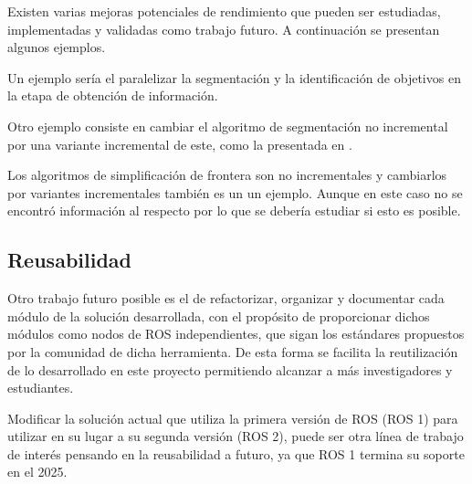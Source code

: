 
Existen varias mejoras potenciales de rendimiento que pueden ser estudiadas,
implementadas y validadas como trabajo futuro. A continuación se presentan
algunos ejemplos.

Un ejemplo sería el paralelizar la segmentación y la identificación de
objetivos en la etapa de obtención de información.

Otro ejemplo consiste en cambiar el algoritmo de segmentación no incremental por una variante
incremental de este, como la presentada en \cite{Liu2015}. 

Los algoritmos de simplificación de frontera son no incrementales y cambiarlos
por variantes incrementales también es un un ejemplo. Aunque en este caso no se
encontró información al respecto por lo que se debería estudiar si esto es
posible.



\subsection{Reusabilidad}

Otro trabajo futuro posible es el de refactorizar, organizar y documentar cada
módulo de la solución desarrollada, con el propósito de proporcionar dichos
módulos como nodos de \gls{ROS} independientes, que sigan los estándares propuestos
por la comunidad de dicha herramienta. De esta forma se facilita la
reutilización de lo desarrollado en este proyecto permitiendo
alcanzar a más investigadores y estudiantes.

Modificar la solución actual que utiliza la primera versión de \gls{ROS} (\gls{ROS} 1)
para utilizar en su lugar a su segunda versión (\gls{ROS} 2), puede ser otra línea de
trabajo de interés pensando en la reusabilidad a futuro, ya que \gls{ROS} 1 termina
su soporte en el 2025.




